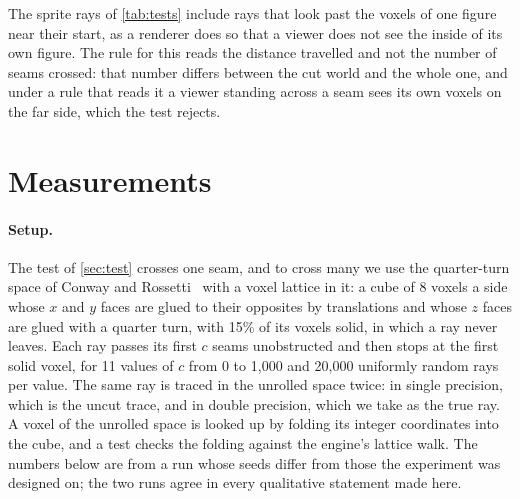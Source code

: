 \documentclass[10pt,a4paper]{article}
\begin{document}
The sprite rays of \cref{tab:tests} include rays that look past the voxels of one figure near
their start, as a renderer does so that a viewer does not see the inside of its own figure. The
rule for this reads the distance travelled and not the number of seams crossed: that number
differs between the cut world and the whole one, and under a rule that reads it a viewer
standing across a seam sees its own voxels on the far side, which the test rejects.

\section{Measurements}
\label{sec:measurements}

\paragraph{Setup.} The test of \cref{sec:test} crosses one seam, and to cross many we use the
quarter-turn space of Conway and Rossetti~\cite{conway2003} with a voxel lattice in it: a cube of
8 voxels a side whose $x$ and $y$ faces are glued to their opposites by translations and whose
$z$ faces are glued with a quarter turn, with 15\% of its voxels solid, in which a ray never
leaves. Each ray passes its first $c$ seams unobstructed and then stops at the first solid voxel, for 11
values of $c$ from 0 to 1{,}000 and 20{,}000 uniformly random rays per value. The same ray is
traced in the unrolled space twice: in single precision, which is the uncut trace, and in double
precision, which we take as the true ray. A voxel of the unrolled space is looked up by folding
its integer coordinates into the cube, and a test checks the folding against the engine's lattice
walk. The numbers below are from a run whose seeds differ from those the experiment was designed
on; the two runs agree in every qualitative statement made here.
\end{document}
